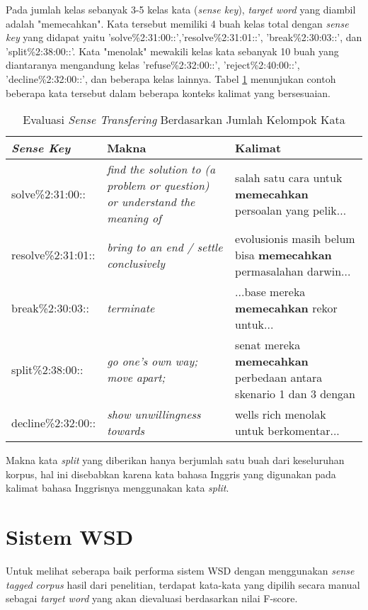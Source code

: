 Pada jumlah kelas sebanyak 3-5 kelas kata (\textit{sense key}), \textit{target word} yang diambil adalah "memecahkan". Kata tersebut memiliki 4 buah kelas total dengan \textit{sense key} yang didapat yaitu 'solve\%2:31:00::','resolve\%2:31:01::', 'break\%2:30:03::', dan 'split\%2:38:00::'. Kata "menolak" mewakili kelas kata sebanyak 10 buah yang diantaranya mengandung kelas 'refuse\%2:32:00::', 'reject\%2:40:00::', 'decline\%2:32:00::', dan beberapa kelas lainnya. Tabel \ref{table:number-classes-sense-transfering-evaluation} menunjukan contoh beberapa kata tersebut dalam beberapa konteks kalimat yang bersesuaian.

\begin{table}
	\centering
	\caption{Evaluasi \textit{Sense Transfering} Berdasarkan Jumlah Kelompok Kata}
	\label{table:number-classes-sense-transfering-evaluation}
	\begin{tabular}{|p{4cm}|p{4cm}|p{4cm}|}
		\hline
		\textit{Sense Key} & Makna & Kalimat
		\\ \hline
		solve\%2:31:00::  & 
		\textit{find the solution to (a problem or question) or understand the meaning of}   & 
		salah satu cara untuk \textbf{memecahkan} persoalan yang pelik...
		\\ \hline
		resolve\%2:31:01:: & 
		\textit{bring to an end / settle conclusively}   & 
		evolusionis masih belum bisa \textbf{memecahkan} permasalahan darwin...
		\\ \hline
		break\%2:30:03:: & 
		\textit{terminate}   & 
		...base mereka \textbf{memecahkan} rekor untuk...
		\\ \hline
		split\%2:38:00:: &
		\textit{go one's own way; move apart;} &
		senat mereka \textbf{memecahkan} perbedaan antara skenario 1 dan 3 dengan
		\\ \hline
		decline\%2:32:00:: &
		\textit{show unwillingness towards} &
		wells rich menolak untuk berkomentar...
		\\ \hline
	\end{tabular}
\end{table}

Makna kata \textit{split} yang diberikan hanya berjumlah satu buah dari keseluruhan korpus, hal ini disebabkan karena kata bahasa Inggris yang digunakan pada kalimat bahasa Inggrisnya menggunakan kata \textit{split}.
\section{Sistem WSD}

Untuk melihat seberapa baik performa sistem WSD dengan menggunakan \textit{sense tagged corpus} hasil dari penelitian, terdapat kata-kata yang dipilih secara manual sebagai \textit{target word} yang akan dievaluasi berdasarkan nilai F-score.